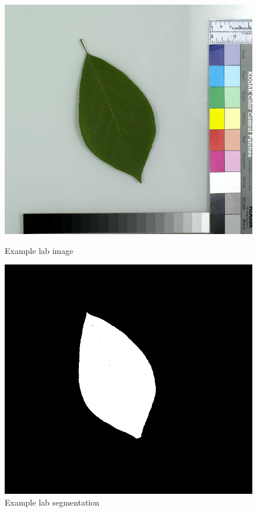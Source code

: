 \documentclass[../Main.tex]{subfiles}
\begin{document}
    \begin{figure}[H]
            \includegraphics[width=\linewidth]{Images/datasets/03_leafsnap1.jpg}
            \caption{Example lab image}
            \label{fig:03_leafsnap1}
        \endminipage\hfill
            \includegraphics[width=\linewidth]{Images/datasets/03_leafsnap1_2.png}
            \caption{Example lab segmentation}
            \label{fig:03_leafsnap1_2}
        \endminipage\hfill
    \end{figure}
\end{document}
